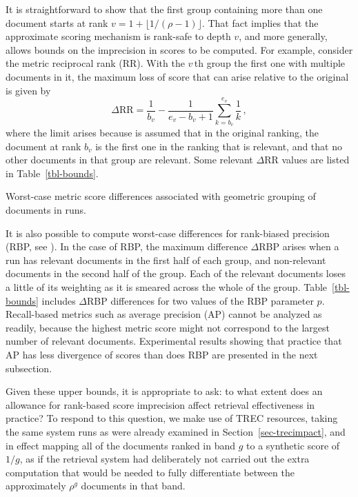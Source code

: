 
It is straightforward to show that the first group containing more
than one document starts at rank $v=1+\lfloor{1/(\rho-1)}\rfloor$.
That fact implies that the approximate scoring mechanism is rank-safe
to depth $v$, and more generally, allows bounds on the imprecision in
scores to be computed.
For example, consider the metric reciprocal rank (RR).
With the $v$\,th group the first one with multiple documents in it,
the maximum loss of score that can arise relative to the original is
given by
\[
	\Delta\mbox{RR} = \frac{1}{b_v} -
		\frac{1}{e_v-b_v+1}\sum_{k=b_v}^{e_v} \frac{1}{k} \,,
\]
where the limit arises because is assumed that in the original
ranking, the document at rank $b_v$ is the first one in the ranking
that is relevant, and that no other documents in that group are
relevant.
Some relevant $\Delta$RR values are listed in Table~\ref{tbl-bounds}.


\begin{table}[t]
\centering

\caption{Worst-case metric score differences associated with geometric
grouping of documents in runs.
\label{tbl-bounds}}
\end{table}

It is also possible to compute worst-case differences for rank-biased
precision (RBP, see {\citet{mz08acmtois}}).
In the case of RBP, the maximum difference $\Delta$RBP arises when a
run has relevant documents in the first half of each group, and
non-relevant documents in the second half of the group.
Each of the relevant documents loses a little of its weighting as it
is smeared across the whole of the group.
Table~\ref{tbl-bounds} includes $\Delta$RBP differences for two
values of the RBP parameter $p$.
Recall-based metrics such as average precision (AP) cannot be
analyzed as readily, because the highest metric score might not
correspond to the largest number of relevant documents.
Experimental results showing that practice that AP has less
divergence of scores than does RBP are presented in the next
subsection.



Given these upper bounds, it is appropriate to ask: to what extent
does an allowance for rank-based score imprecision affect retrieval
effectiveness in practice?
To respond to this question, we make use of TREC resources, taking
the same system runs as were already examined in
Section~\ref{sec-trecimpact}, and in effect mapping all of the
documents ranked in band $g$ to a synthetic score of $1/g$, as if the
retrieval system had deliberately not carried out the extra
computation that would be needed to fully differentiate between the
approximately $\rho^g$ documents in that band.

